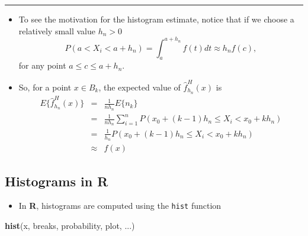 \documentclass[]{book}
\newenvironment{Shaded}{\begin{snugshade}}{\end{snugshade}}
\newcommand{\KeywordTok}[1]{\textcolor[rgb]{0.13,0.29,0.53}{\textbf{#1}}}
\newcommand{\NormalTok}[1]{#1}
\providecommand{\tightlist}{%
  \setlength{\itemsep}{0pt}\setlength{\parskip}{0pt}}
\begin{document}
\begin{center}\rule{0.5\linewidth}{\linethickness}\end{center}

\begin{itemize}
\item
  To see the motivation for the histogram estimate, notice that if we choose a
  relatively small value \(h_{n} > 0\)
  \begin{equation}
  P(a < X_{i} < a + h_{n}) = \int_{a}^{a + h_{n}} f(t) dt \approx h_{n}f(c), \nonumber
  \end{equation}
  for any point \(a \leq c \leq a + h_{n}\).
\item
  So, for a point \(x \in B_{k}\), the expected value of \(\hat{f}_{h_{n}}^{H}(x)\) is
  \begin{eqnarray}
  E\{ \hat{f}_{h_{n}}^{H}(x) \} &=& \frac{1}{n h_{n}} E\{ n_{k} \} \nonumber \\
  &=& \frac{1}{n h_{n}} \sum_{i=1}^{n} P( x_{0} + (k-1)h_{n} \leq X_{i} < x_{0} + kh_{n}  ) \nonumber \\
  &=& \frac{1}{h_{n}} P( x_{0} + (k-1)h_{n} \leq X_{i} < x_{0} + kh_{n}  )  \nonumber \\
  &\approx& f(x) \nonumber
  \end{eqnarray}
\end{itemize}

\hypertarget{histograms-in-r}{%
\subsection{Histograms in R}\label{histograms-in-r}}

\begin{itemize}
\tightlist
\item
  In \textbf{R}, histograms are computed using the \texttt{hist} function
\end{itemize}

\begin{Shaded}
\begin{Highlighting}[]
\KeywordTok{hist}\NormalTok{(x, breaks, probability, plot, ...)}
\end{Highlighting}
\end{Shaded}
\end{document}
